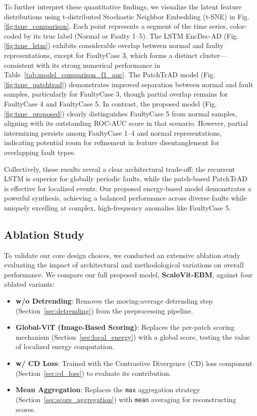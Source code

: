\documentclass{article}
\begin{document}
To further interpret these quantitative findings, we visualize the latent feature distributions using t-distributed Stochastic Neighbor Embedding (t-SNE) in Fig.\ref{fig:tsne_comparison}. Each point represents a segment of the time series, color-coded by its true label (Normal or Faulty 1–5).
The LSTM EncDec-AD (Fig.\ref{fig:tsne_lstm}) exhibits considerable overlap between normal and faulty representations, except for FaultyCase 3, which forms a distinct cluster—consistent with its strong numerical performance in Table~\ref{tab:model_comparison_f1_auc}.
The PatchTrAD model (Fig.\ref{fig:tsne_patchtrad}) demonstrates improved separation between normal and fault samples, particularly for FaultyCase 3, though partial overlap remains for FaultyCase 4 and FaultyCase 5.
In contrast, the proposed model (Fig.\ref{fig:tsne_proposed}) clearly distinguishes FaultyCase 5 from normal samples, aligning with its outstanding ROC-AUC score in that scenario. However, partial intermixing persists among FaultyCase 1–4 and normal representations, indicating potential room for refinement in feature disentanglement for overlapping fault types.

Collectively, these results reveal a clear architectural trade-off: the recurrent LSTM is superior for globally periodic faults, while the patch-based PatchTrAD is effective for localized events. Our proposed energy-based model demonstrates a powerful synthesis, achieving a balanced performance across diverse faults while uniquely excelling at complex, high-frequency anomalies like FaultyCase 5.

\subsection{Ablation Study}\label{sec:ablation_study}
To validate our core design choices, we conducted an extensive ablation study evaluating the impact of architectural and methodological variations on overall performance. We compare our full proposed model, \textbf{ScaloVit-EBM}, against four ablated variants:
\begin{itemize}
    \item \textbf{w/o Detrending}: Removes the moving-average detrending step (Section~\ref{sec:detrending}) from the preprocessing pipeline.
    \item \textbf{Global-ViT (Image-Based Scoring)}: Replaces the per-patch scoring mechanism (Section~\ref{sec:local_energy}) with a global score, testing the value of localized energy computation.
    \item \textbf{w/ CD Loss}: Trained with the Contrastive Divergence (CD) loss component (Section~\ref{sec:cd_loss}) to evaluate its contribution.
    \item \textbf{Mean Aggregation}: Replaces the \texttt{max} aggregation strategy (Section~\ref{sec:score_aggregation}) with \texttt{mean} averaging for reconstructing scores.
\end{itemize}
\end{document}
